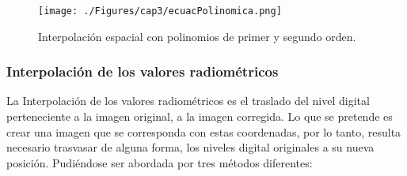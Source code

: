     \begin{figure}[H]
    	\centering
    	\texttt{[image: ./Figures/cap3/ecuacPolinomica.png]}
    	\caption{Interpolaci\'on espacial con polinomios de primer y segundo orden.}
    	\label{fig:intPolEcua}
    \end{figure}


\subsubsection{Interpolaci\'on de los valores radiom\'etricos}
La Interpolaci\'on de los valores radiom\'etricos es el traslado del nivel digital perteneciente a la imagen original, a la imagen corregida. Lo que se pretende es crear una imagen que se corresponda con estas coordenadas, por lo tanto, resulta necesario trasvasar de alguna forma, los niveles digital originales a su nueva posici\'on. Pudi\'endose ser abordada por tres m\'etodos diferentes:
